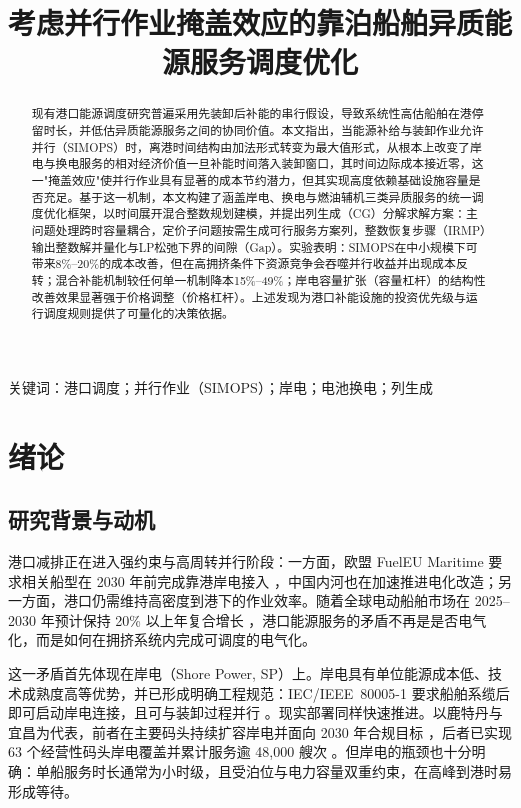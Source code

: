 \documentclass[UTF8, a4paper, 12pt]{ctexart}
\theoremstyle{plain}
\theoremstyle{definition}
\theoremstyle{remark}
\begin{document}
\title{\heiti{} 考虑并行作业掩盖效应的靠泊船舶异质能源服务调度优化}
\author{}
\date{}
\maketitle

\begin{abstract}
现有港口能源调度研究普遍采用先装卸后补能的串行假设，导致系统性高估船舶在港停留时长，并低估异质能源服务之间的协同价值。本文指出，当能源补给与装卸作业允许并行（SIMOPS）时，离港时间结构由加法形式转变为最大值形式，从根本上改变了岸电与换电服务的相对经济价值一旦补能时间落入装卸窗口，其时间边际成本接近零，这一"掩盖效应"使并行作业具有显著的成本节约潜力，但其实现高度依赖基础设施容量是否充足。基于这一机制，本文构建了涵盖岸电、换电与燃油辅机三类异质服务的统一调度优化框架，以时间展开混合整数规划建模，并提出列生成（CG）分解求解方案：主问题处理跨时容量耦合，定价子问题按需生成可行服务方案列，整数恢复步骤（IRMP）输出整数解并量化与LP松弛下界的间隙（Gap）。实验表明：SIMOPS在中小规模下可带来8\%--20\%的成本改善，但在高拥挤条件下资源竞争会吞噬并行收益并出现成本反转；混合补能机制较任何单一机制降本15\%--49\%；岸电容量扩张（容量杠杆）的结构性改善效果显著强于价格调整（价格杠杆）。上述发现为港口补能设施的投资优先级与运行调度规则提供了可量化的决策依据。
\end{abstract}

\noindent 关键词：港口调度；并行作业（SIMOPS）；岸电；电池换电；列生成

\section{绪论}
\label{sec:intro}

\subsection{研究背景与动机}
港口减排正在进入强约束与高周转并行阶段：一方面，欧盟 FuelEU Maritime 要求相关船型在 2030 年前完成靠港岸电接入 \citep{EU2025}，中国内河也在加速推进电化改造；另一方面，港口仍需维持高密度到港下的作业效率。随着全球电动船舶市场在 2025--2030 年预计保持 20\% 以上年复合增长 \citep{Markets2025}，港口能源服务的矛盾不再是是否电气化，而是如何在拥挤系统内完成可调度的电气化。
 
这一矛盾首先体现在岸电（Shore Power, SP）上。岸电具有单位能源成本低、技术成熟度高等优势，并已形成明确工程规范：IEC/IEEE~80005-1 要求船舶系缆后即可启动岸电连接，且可与装卸过程并行 \citep{IEC80005}。现实部署同样快速推进。以鹿特丹与宜昌为代表，前者在主要码头持续扩容岸电并面向 2030 年合规目标 \citep{Winkel2016}，后者已实现 63 个经营性码头岸电覆盖并累计服务逾 48{,}000 艘次 \citep{ICCT2023}。但岸电的瓶颈也十分明确：单船服务时长通常为小时级，且受泊位与电力容量双重约束，在高峰到港时易形成等待。
 
\end{document}
